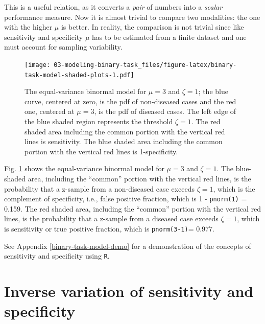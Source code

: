 \documentclass[
]{book}
\begin{document}
This is a useful relation, as it converts a \emph{pair} of numbers into a \emph{scalar} performance measure. Now it is almost trivial to compare two modalities: the one with the higher \(\mu\) is better. In reality, the comparison is not trivial since like sensitivity and specificity \(\mu\) has to be estimated from a finite dataset and one must account for sampling variability.

\begin{figure}
\centering
\texttt{[image: 03-modeling-binary-task\_files/figure-latex/binary-task-model-shaded-plots-1.pdf]}
\caption{\label{fig:binary-task-model-shaded-plots}The equal-variance binormal model for \(\mu = 3\) and \(\zeta = 1\); the blue curve, centered at zero, is the pdf of non-diseased cases and the red one, centered at \(\mu = 3\), is the pdf of diseased cases. The left edge of the blue shaded region represents the threshold \(\zeta = 1\). The red shaded area including the common portion with the vertical red lines is sensitivity. The blue shaded area including the common portion with the vertical red lines is 1-specificity.}
\end{figure}

Fig. \ref{fig:binary-task-model-shaded-plots} shows the equal-variance binormal model for \(\mu = 3\) and \(\zeta = 1\). The blue-shaded area, including the ``common'' portion with the vertical red lines, is the probability that a z-sample from a non-diseased case exceeds \(\zeta = 1\), which is the complement of specificity, i.e., false positive fraction, which is 1 - \texttt{pnorm(1)} = 0.159. The red shaded area, including the ``common'' portion with the vertical red lines, is the probability that a z-sample from a diseased case exceeds \(\zeta = 1\), which is sensitivity or true positive fraction, which is \texttt{pnorm(3-1)}= 0.977.

See Appendix \ref{binary-task-model-demo} for a demonstration of the concepts of sensitivity and specificity using \texttt{R}.

\hypertarget{binary-task-model-sensitivity-specificity-inverse-variation}{%
\section{Inverse variation of sensitivity and specificity}\label{binary-task-model-sensitivity-specificity-inverse-variation}}
\end{document}
